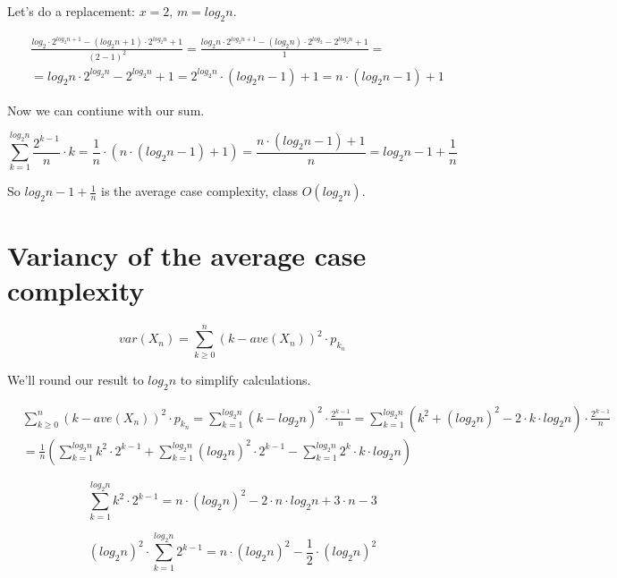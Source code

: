 \documentclass[a4paper]{article}
\begin{document}
Let's do a replacement: $x = 2$, $m = log_2n$.

\begin{align*}
    &\frac{log_2 \cdot 2^{log_2n+1}  - (log_2n+1) \cdot 2^{log_2n} + 1}{(2-1)^2} = 
    \frac{log_2n \cdot 2^{log_2n+1}  - (log_2n) \cdot 2^{log_2} - 2^{log_2n} + 1}{1} = \\&=
    log_2n \cdot 2^{log_2n} - 2^{log_2n} + 1 =
    2^{log_2n} \cdot (log_2n - 1) + 1 =
    n \cdot (log_2n - 1) + 1
\end{align*}


Now we can contiune with our sum.

\begin{equation*}
    \sum_{k=1}^{log_2n}{\frac{2^{k-1}}{n} \cdot k} =
    \frac{1}{n} \cdot (n \cdot (log_2n - 1) + 1) = 
    \frac{n \cdot (log_2n - 1) + 1}{n} = 
    log_2n - 1 + \frac{1}{n}
\end{equation*}

So $log_2n - 1 + \frac{1}{n}$ is the average case complexity, class $O(log_2n)$.


\section{Variancy of the average case complexity}

\begin{equation*}
var(X_n) = \sum_{k \geq 0}^{n}{(k - ave(X_n))^2 \cdot p_{k_n}}
\end{equation*}

We'll round our result to $log_2n$ to simplify calculations.

\begin{align*}
    &\sum_{k \geq 0}^{n}{(k - ave(X_n))^2 \cdot p_{k_n}} =
     \sum_{k = 1}^{log_2n}{(k - log_2n)^2 \cdot \frac{2^{k-1}}{n}} =
     \sum_{k = 1}^{log_2n}{(k^2 + (log_2n)^2 - 2 \cdot k \cdot log_2n) \cdot \frac{2^{k-1}}{n}} \\&=
     \frac{1}{n} (\sum_{k = 1}^{log_2n}{ k^2 \cdot 2^{k-1}} +
     \sum_{k = 1}^{log_2n}{(log_2n)^2 \cdot 2^{k-1}}
     - \sum_{k = 1}^{log_2n}{2^k \cdot k \cdot log_2n})
\end{align*}

\begin{equation*}
    \sum_{k = 1}^{log_2n}{ k^2 \cdot 2^{k-1}} = n \cdot (log_2n)^2 - 2 \cdot n \cdot log_2n + 3 \cdot n - 3
\end{equation*}

\begin{equation*}
    (log_2n)^2 \cdot \sum_{k = 1}^{log_2n}{2^{k-1}} = 
    n \cdot (log_2n)^2 - \frac{1}{2} \cdot (log_2n)^2
\end{equation*}
\end{document}
